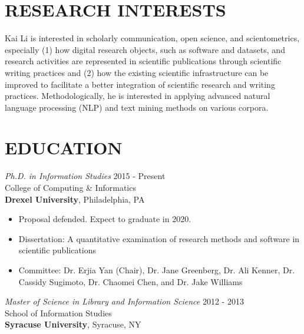 \documentclass[margin, 10pt]{res} %
\begin{document}
\begin{resume}

 
\section{RESEARCH INTERESTS}  

Kai Li is interested in scholarly communication, open science, and scientometrics, especially (1) how digital research objects, such as software and datasets, and research activities are represented in scientific publications through scientific writing practices and (2) how the existing scientific infrastructure can be improved to facilitate a better integration of scientific research and writing practices. Methodologically, he is interested in applying advanced natural language processing (NLP) and text mining methods on various corpora.

 
\section{EDUCATION}

{\sl Ph.D. in Information Studies} \hfill 2015 - Present \\
College of Computing \& Informatics\\
\textbf{Drexel University}, Philadelphia, PA
\begin{itemize}
\item Proposal defended. Expect to graduate in 2020.
\item Dissertation: A quantitative examination of research methods and software in scientific publications
\item Committee: Dr. Erjia Yan (Chair), Dr. Jane Greenberg, Dr. Ali Kenner, Dr. Cassidy Sugimoto, Dr. Chaomei Chen, and Dr. Jake Williams
\end{itemize} 

{\sl Master of Science in Library and Information Science} \hfill 2012 - 2013 \\
School of Information Studies\\
\textbf{Syracuse University}, Syracuse, NY
 

\end{resume}
\end{document}
